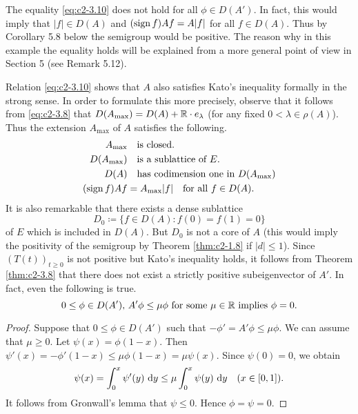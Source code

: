 \begin{remark}\label{rem:c2-3.15}
The equality \eqref{eq:c2-3.10} does not hold for all $\phi \in D(A')$. 
In fact, this would imply that $|f| \in D(A)$ and $(\operatorname{sign}  f)Af = A|f|$ for
all $f \in D(A)$. 
Thus by Corollary  5.8 
below the semigroup would be positive. 
The reason why in this example the equality holds will be explained from a more general point of view in Section 5 (see Remark 5.12).
\end{remark}
Relation \eqref{eq:c2-3.10} shows that $A$ also satisfies Kato's inequality
formally in the strong sense. 
In order to formulate this more precisely, observe that it follows from \eqref{eq:c2-3.8} that $D(A_{\max}) = D(A) + \mathbb{R} \cdot e_{\lambda}$ (for any fixed $0 < \lambda \in \rho(A)$). Thus the extension $A_{\max}$ of $A$ satisfies the following.
\begin{align}\label{eq:c2-3.12}
A_{\max} 	& \quad \text{is closed}. \\
D(A_{\max}) & \quad \text{is a sublattice of } E. \\
D(A) & \quad \text{has codimension one in } D(A_{\max}) \\
(\operatorname{sign}  f)Af &= A_{\max}|f| \quad \text{for all } f \in D(A).
\end{align}
It is also remarkable that there exists a dense sublattice 
%
\[
	D_{0} \coloneq \{f \in D(A) \colon f(0) = f(1) = 0\} 
\]
%
of $E$ which is included in $D(A)$.
But $D_{0}$ is not a core of $A$ (this would imply the positivity of the semigroup by Theorem \ref{thm:c2-1.8}   if $|d| \leq 1$).
Since $(T(t))_{t \geq 0}$ is not positive but Kato's inequality holds, it
follows from Theorem \ref{thm:c2-3.8}   that there does not exist a strictly positive subeigenvector of $A'$. 
In fact, even the following is true.
\begin{equation} \label{eq:c2-3.16} 
0 \leq \phi \in D(A'), \, A'\phi \leq \mu\phi \text{ for some } \mu \in \mathbb{R} \text{ implies } \phi = 0.
\end{equation}
\begin{proof}
Suppose that $0 \leq \phi \in D(A')$ such that $-\phi' = A'\phi \leq \mu\phi$. 
We can assume that $\mu \geq 0$. 
Let $\psi(x) = \phi(1-x)$. 
Then $\psi'(x) = -\phi'(1-x) \leq \mu\phi(1-x) = \mu\psi(x)$. 
Since $\psi(0) = 0$, we obtain
\begin{equation*} \label{eq:c2-3-KGK} 
\psi(x) = \int_{0}^{x} \psi'(y) \, \mathop{}\!\mathrm{d}{y} \leq \mu \int_{0}^{x} \psi(y) \, \mathop{}\!\mathrm{d}{y} \quad (x \in [0,1]).
\end{equation*}
It follows from Gronwall's lemma that $\psi \leq 0$. Hence $\phi = \psi = 0$.
\end{proof}
